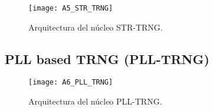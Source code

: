 				
				\begin{figure}[hbtp]
					\caption{Arquitectura del núcleo STR-TRNG.}
					\centering
					\texttt{[image: A5\_STR\_TRNG]}
					\label{fig:A5_STR_TRNG}
				\end{figure}
				
				
				
		\subsection{PLL based TRNG (PLL-TRNG)}
	
				
				\begin{figure}[hbtp]
					\caption{Arquitectura del núcleo PLL-TRNG.}
					\centering
					\texttt{[image: A6\_PLL\_TRNG]}
					\label{fig:A6_PLL_TRNG}
				\end{figure}
				
